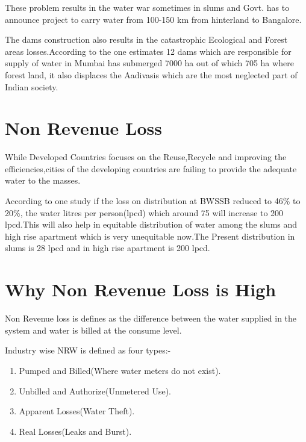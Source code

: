 \documentclass[12pt]{iiscthes}
\begin{document}
    These problem results in the water war sometimes in slums and Govt. has to announce project to carry water from 100-150 km from hinterland to Bangalore.
    

    The dams construction also results in the catastrophic Ecological and Forest areas losses.According to the one estimates 12 dams which are responsible for supply of water in Mumbai has submerged 7000 ha out of which 705 ha where forest land, it also displaces the Aadivasis which are the most neglected part of Indian society.
    



    
    
\section{Non Revenue Loss}
	  While Developed Countries focuses on the Reuse,Recycle and improving the 
	  efficiencies,cities of the developing countries are failing to provide the 
	  adequate water to the masses.
	  
	  According to one study if the loss on distribution at BWSSB reduced to 46\%
	  to 20\%, the water litres per person(lpcd) which around 75 will increase to 200 lpcd.This will also help in equitable distribution of water among the slums and high rise apartment which is very unequitable now.The Present distribution in slums is 28 lpcd and in high rise apartment is 200 lpcd.
	 
\section{Why Non Revenue Loss  is High}
 
     Non Revenue loss is defines as the difference between the 
     water supplied in the system and water is billed at the consume level.
     
      Industry wise NRW is defined as four types:-
      \begin{enumerate}
      	\item Pumped and  Billed(Where water meters do not exist).
      	\item Unbilled and Authorize(Unmetered Use).
      	\item Apparent Losses(Water Theft).
      	\item Real Losses(Leaks and Burst).
      \end{enumerate}
     
\end{document}
